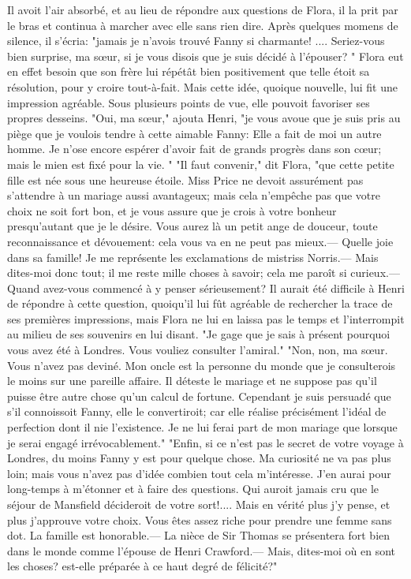 Il avoit l'air absorbé, et au lieu de répondre\setcounter{page}{255} aux questions de Flora, il la prit par le bras et continua à marcher avec elle sans rien dire. Après quelques momens de silence, il s'écria: "jamais je n'avois trouvé Fanny si charmante! .... Seriez-vous bien surprise, ma sœur, si je vous disois que je suis décidé à l'épouser? " Flora eut en effet besoin que son frère lui répétât bien positivement que telle étoit sa résolution, pour y croire tout-à-fait. Mais cette idée, quoique nouvelle, lui fit une impression agréable. Sous plusieurs points de vue, elle pouvoit favoriser ses propres desseins. "Oui, ma sœur," ajouta Henri, "je vous avoue que je suis pris au piège que je voulois tendre à cette aimable Fanny: Elle a fait de moi un autre homme. Je n'ose encore espérer d'avoir fait de grands progrès dans son cœur; mais le mien est fixé pour la vie. " "Il faut convenir," dit Flora, "que cette petite fille est née sous une heureuse étoile. Miss Price ne devoit assurément pas s'attendre à un mariage aussi avantageux; mais cela n'empêche pas que votre choix ne soit fort bon, et je vous assure que je crois à votre bonheur presqu'autant que je le désire. Vous aurez là un petit ange de douceur, toute reconnaissance\setcounter{page}{256} et dévouement: cela vous va en ne peut pas mieux.— Quelle joie dans sa famille! Je me représente les exclamations de mistriss Norris.— Mais dites-moi donc tout; il me reste mille choses à savoir; cela me paroît si curieux.— Quand avez-vous commencé à y penser sérieusement?
Il aurait été difficile à Henri de répondre à cette question, quoiqu'il lui fût agréable de rechercher la trace de ses premières impressions, mais Flora ne lui en laissa pas le temps et l'interrompit au milieu de ses souvenirs en lui disant. "Je gage que je sais à présent pourquoi vous avez été à Londres. Vous vouliez consulter l'amiral."
"Non, non, ma sœur. Vous n'avez pas deviné. Mon oncle est la personne du monde que je consulterois le moins sur une pareille affaire. Il déteste le mariage et ne suppose pas qu'il puisse être autre chose qu'un calcul de fortune. Cependant je suis persuadé que s'il connoissoit Fanny, elle le convertiroit; car elle réalise précisément l'idéal de perfection dont il nie l'existence. Je ne lui ferai part de mon mariage que lorsque je serai engagé irrévocablement."
"Enfin, si ce n'est pas le secret de votre voyage à Londres, du moins Fanny y est pour\setcounter{page}{257} quelque chose. Ma curiosité ne va pas plus loin; mais vous n'avez pas d'idée combien tout cela m'intéresse. J'en aurai pour long-temps à m'étonner et à faire des questions. Qui auroit jamais cru que le séjour de Mansfield décideroit de votre sort!.... Mais en vérité plus j'y pense, et plus j'approuve votre choix. Vous êtes assez riche pour prendre une femme sans dot. La famille est honorable.— La nièce de Sir Thomas se présentera fort bien dans le monde comme l'épouse de Henri Crawford.— Mais, dites-moi où en sont les choses? est-elle préparée à ce haut degré de félicité?"
